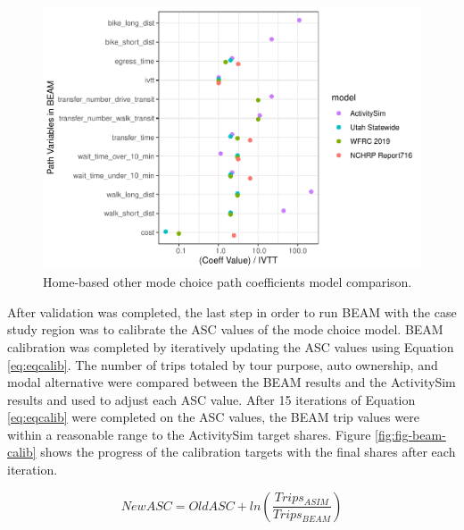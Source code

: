 \documentclass[12pt, oneside, openright]{byuthesis}
\begin{document}
\begin{figure}

{\centering \includegraphics{thesis_files/figure-latex/hbo-1} 

}

\caption{Home-based other mode choice path coefficients model comparison.}\label{fig:hbo}
\end{figure}

After validation was completed, the last step in order to run BEAM with the case study region was to calibrate the ASC values of the mode choice model. BEAM calibration was completed by iteratively updating the ASC values using Equation \eqref{eq:eqcalib}. The number of trips totaled by tour purpose, auto ownership, and modal alternative were compared between the BEAM results and the ActivitySim results and used to adjust each ASC value. After 15 iterations of Equation \eqref{eq:eqcalib} were completed on the ASC values, the BEAM trip values were within a reasonable range to the ActivitySim target shares. Figure \ref{fig:fig-beam-calib} shows the progress of the calibration targets with the final shares after each iteration.

\begin{equation}
  NewASC = OldASC + ln(\frac{Trips_{ASIM}}{Trips_{BEAM}}) \label{eq:eqcalib}
\end{equation}
\end{document}
